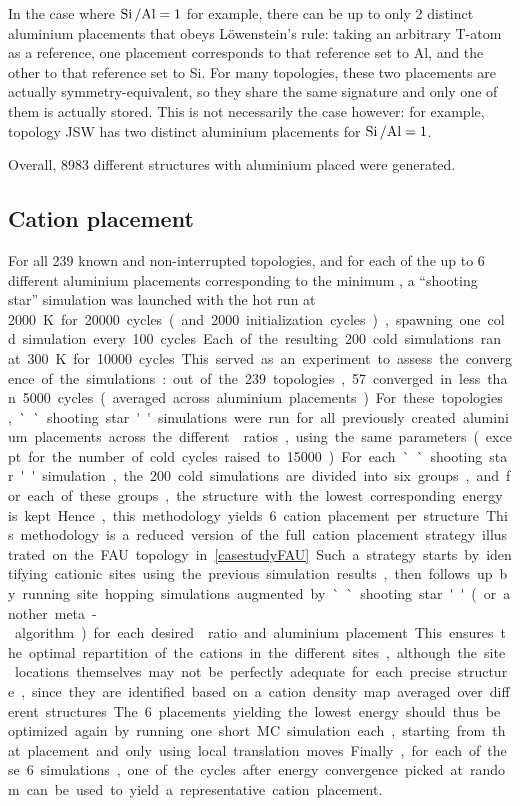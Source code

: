 \documentclass[main.tex]{subfiles}
\begin{document}
In the case where $\mbox{Si\,/Al} = 1$ for example, there can be up to only 2 distinct aluminium placements that obeys L\"owenstein's rule: taking an arbitrary T-atom as a reference, one placement corresponds to that reference set to Al, and the other to that reference set to Si. For many topologies, these two placements are actually symmetry-equivalent, so they share the same signature and only one of them is actually stored. This is not necessarily the case however: for example, topology JSW has two distinct aluminium placements for $\mbox{Si\,/Al} = 1$.

Overall, \num{8983} different structures with aluminium placed were generated.

\subsection{Cation placement}

For all 239 known and non-interrupted topologies, and for each of the up to 6 different aluminium placements corresponding to the minimum \SiAl, a ``shooting star'' simulation was launched with the hot run at \qty{2000}K for \num{20000} cycles (and \num{2000} initialization cycles), spawning one cold simulation every \num{100} cycles. Each of the resulting \num{200} cold simulations ran at \qty{300}K for \num{10000} cycles. This served as an experiment to assess the convergence of the simulations: out of the 239 topologies, 57 converged in less than \num{5000} cycles (averaged across aluminium placements). For these topologies, ``shooting star'' simulations were run for all previously created aluminium placements across the different \SiAl ratios, using the same parameters (except for the number of cold cycles raised to \num{15000}). For each ``shooting star'' simulation, the \num{200} cold simulations are divided into six groups, and for each of these groups, the structure with the lowest corresponding energy is kept. Hence, this methodology yields 6 cation placement per structure.

This methodology is a reduced version of the full cation placement strategy illustrated on the FAU topology in \cref{casestudyFAU}. Such a strategy starts by identifying cationic sites using the previous simulation results, then follows up by running site hopping simulations augmented by ``shooting star'' (or another meta-algorithm) for each desired \SiAl ratio and aluminium placement. This ensures the optimal repartition of the cations in the different sites, although the site locations themselves may not be perfectly adequate for each precise structure, since they are identified based on a cation density map averaged over different structures. The 6 placements yielding the lowest energy should thus be optimized again by running one short MC simulation each, starting from that placement and only using local translation moves. Finally, for each of these 6 simulations, one of the cycles after energy convergence picked at random can be used to yield a representative cation placement.
\end{document}
